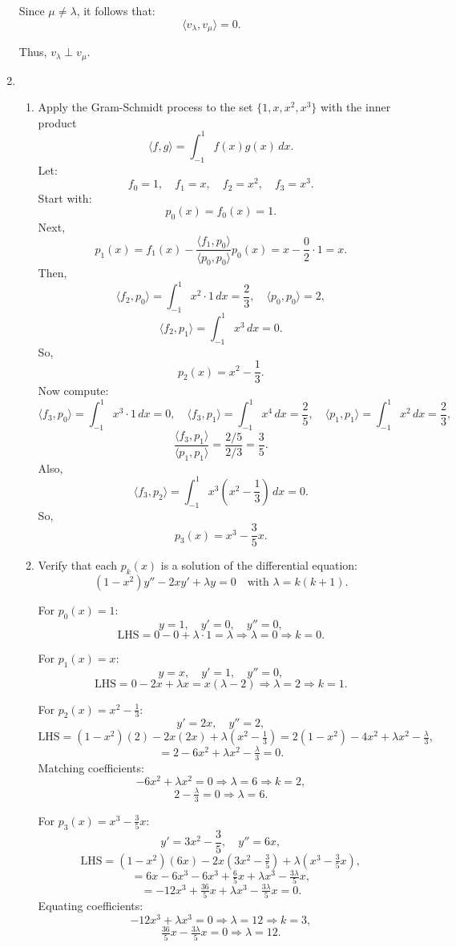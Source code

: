 \documentclass[12pt]{article}
\begin{document}
\begin{enumerate}
Since \( \mu \ne \lambda \), it follows that:
\[
\langle v_\lambda, v_\mu \rangle = 0.
\]

Thus, \( v_\lambda \perp v_\mu \).

\item 
\begin{enumerate}

\item Apply the Gram-Schmidt process to the set $\{1, x, x^2, x^3\}$ with the inner product 
\[
\langle f, g \rangle = \int_{-1}^{1} f(x)g(x)\, dx.
\]
Let:
\[
f_0 = 1, \quad f_1 = x, \quad f_2 = x^2, \quad f_3 = x^3.
\]
Start with:
\[
p_0(x) = f_0(x) = 1.
\]
Next,
\[
p_1(x) = f_1(x) - \frac{\langle f_1, p_0 \rangle}{\langle p_0, p_0 \rangle} p_0(x)
= x - \frac{0}{2} \cdot 1 = x.
\]
Then,
\[
\langle f_2, p_0 \rangle = \int_{-1}^{1} x^2 \cdot 1\, dx = \frac{2}{3}, \quad \langle p_0, p_0 \rangle = 2,
\]
\[
\langle f_2, p_1 \rangle = \int_{-1}^{1} x^3\, dx = 0.
\]
So,
\[
p_2(x) = x^2 - \frac{1}{3}.
\]
Now compute:
\[
\langle f_3, p_0 \rangle = \int_{-1}^{1} x^3 \cdot 1\, dx = 0, \quad
\langle f_3, p_1 \rangle = \int_{-1}^{1} x^4\, dx = \frac{2}{5}, \quad
\langle p_1, p_1 \rangle = \int_{-1}^{1} x^2\, dx = \frac{2}{3},
\]
\[
\frac{\langle f_3, p_1 \rangle}{\langle p_1, p_1 \rangle} = \frac{2/5}{2/3} = \frac{3}{5}.
\]
Also,
\[
\langle f_3, p_2 \rangle = \int_{-1}^{1} x^3 \left(x^2 - \frac{1}{3}\right)\, dx = 0.
\]
So,
\[
p_3(x) = x^3 - \frac{3}{5}x.
\]

\item Verify that each $p_k(x)$ is a solution of the differential equation:
\[
(1 - x^2)y'' - 2x y' + \lambda y = 0 \quad \text{with } \lambda = k(k+1).
\]

For \( p_0(x) = 1 \):
\[
y = 1, \quad y' = 0, \quad y'' = 0,
\]
\[
\text{LHS} = 0 - 0 + \lambda \cdot 1 = \lambda \Rightarrow \lambda = 0 \Rightarrow k = 0.
\]

For \( p_1(x) = x \):
\[
y = x, \quad y' = 1, \quad y'' = 0,
\]
\[
\text{LHS} = 0 - 2x + \lambda x = x(\lambda - 2) \Rightarrow \lambda = 2 \Rightarrow k = 1.
\]

For \( p_2(x) = x^2 - \frac{1}{3} \):
\[
y' = 2x, \quad y'' = 2,
\]
\[
\text{LHS} = (1 - x^2)(2) - 2x(2x) + \lambda(x^2 - \tfrac{1}{3}) 
= 2(1 - x^2) - 4x^2 + \lambda x^2 - \tfrac{\lambda}{3},
\]
\[
= 2 - 6x^2 + \lambda x^2 - \tfrac{\lambda}{3} = 0.
\]
Matching coefficients:
\[
-6x^2 + \lambda x^2 = 0 \Rightarrow \lambda = 6 \Rightarrow k = 2,
\]
\[
2 - \tfrac{\lambda}{3} = 0 \Rightarrow \lambda = 6.
\]

For \( p_3(x) = x^3 - \frac{3}{5}x \):
\[
y' = 3x^2 - \frac{3}{5}, \quad y'' = 6x,
\]
\[
\text{LHS} = (1 - x^2)(6x) - 2x(3x^2 - \tfrac{3}{5}) + \lambda(x^3 - \tfrac{3}{5}x),
\]
\[
= 6x - 6x^3 - 6x^3 + \tfrac{6}{5}x + \lambda x^3 - \tfrac{3\lambda}{5}x,
\]
\[
= -12x^3 + \tfrac{36}{5}x + \lambda x^3 - \tfrac{3\lambda}{5}x = 0.
\]
Equating coefficients:
\[
-12x^3 + \lambda x^3 = 0 \Rightarrow \lambda = 12 \Rightarrow k = 3,
\]
\[
\tfrac{36}{5}x - \tfrac{3\lambda}{5}x = 0 \Rightarrow \lambda = 12.
\]


\end{enumerate}
\end{enumerate}
\end{document}
